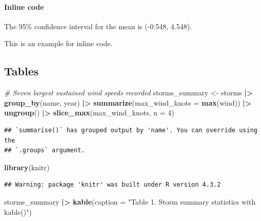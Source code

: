 \documentclass[
]{article}
\newenvironment{Shaded}{\begin{snugshade}}{\end{snugshade}}
\newcommand{\AttributeTok}[1]{\textcolor[rgb]{0.13,0.29,0.53}{#1}}
\newcommand{\CommentTok}[1]{\textcolor[rgb]{0.56,0.35,0.01}{\textit{#1}}}
\newcommand{\DecValTok}[1]{\textcolor[rgb]{0.00,0.00,0.81}{#1}}
\newcommand{\FunctionTok}[1]{\textcolor[rgb]{0.13,0.29,0.53}{\textbf{#1}}}
\newcommand{\NormalTok}[1]{#1}
\newcommand{\OtherTok}[1]{\textcolor[rgb]{0.56,0.35,0.01}{#1}}
\newcommand{\SpecialCharTok}[1]{\textcolor[rgb]{0.81,0.36,0.00}{\textbf{#1}}}
\newcommand{\StringTok}[1]{\textcolor[rgb]{0.31,0.60,0.02}{#1}}
\begin{document}
\hypertarget{inline-code}{%
\paragraph{Inline code}\label{inline-code}}

The 95\% confidence interval for the mean is (-0.548, 4.548).

This is an example for inline code.

\hypertarget{tables}{%
\subsection{Tables}\label{tables}}

\begin{Shaded}
\begin{Highlighting}[]
\CommentTok{\# Seven largest sustained wind speeds recorded}
\NormalTok{storms\_summary }\OtherTok{\textless{}{-}}\NormalTok{ storms }\SpecialCharTok{|\textgreater{}} 
  \FunctionTok{group\_by}\NormalTok{(name, year) }\SpecialCharTok{|\textgreater{}} 
  \FunctionTok{summarize}\NormalTok{(}\AttributeTok{max\_wind\_knots =} \FunctionTok{max}\NormalTok{(wind)) }\SpecialCharTok{|\textgreater{}} 
  \FunctionTok{ungroup}\NormalTok{() }\SpecialCharTok{|\textgreater{}} 
  \FunctionTok{slice\_max}\NormalTok{(max\_wind\_knots, }\AttributeTok{n =} \DecValTok{4}\NormalTok{)}
\end{Highlighting}
\end{Shaded}

\begin{verbatim}
## `summarise()` has grouped output by 'name'. You can override using the
## `.groups` argument.
\end{verbatim}

\begin{Shaded}
\begin{Highlighting}[]
\FunctionTok{library}\NormalTok{(knitr)}
\end{Highlighting}
\end{Shaded}

\begin{verbatim}
## Warning: package 'knitr' was built under R version 4.3.2
\end{verbatim}

\begin{Shaded}
\begin{Highlighting}[]
\NormalTok{storms\_summary }\SpecialCharTok{|\textgreater{}} 
  \FunctionTok{kable}\NormalTok{(}\AttributeTok{caption =} \StringTok{"Table 1. Storm summary statistics with kable()"}\NormalTok{)}
\end{Highlighting}
\end{Shaded}
\end{document}
